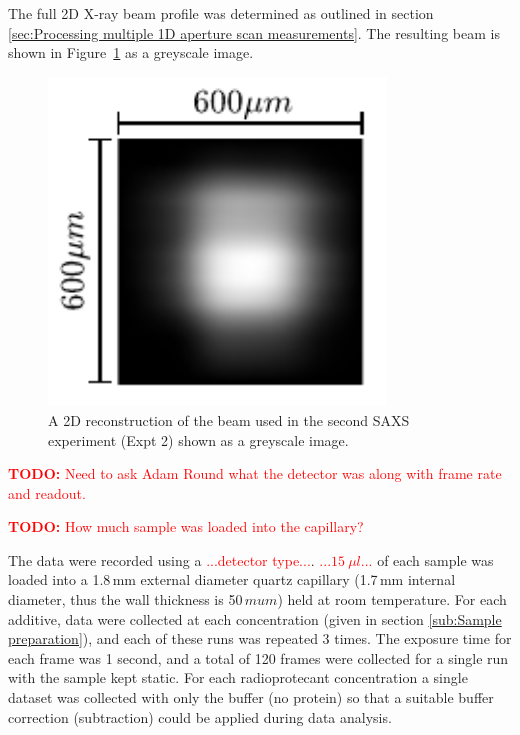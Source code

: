 The full 2D X-ray beam profile was determined as outlined in section \ref{sec:Processing multiple 1D aperture scan measurements}. The resulting beam is shown in Figure~\ref{fig:SAXS beam profile} as a greyscale image.
\begin{figure}
    \centering
    \includegraphics[width=0.8\textwidth]{figures/saxs/SAXS_beam.pdf}
    \caption[A 2D reconstruction of the beam used in the second SAXS experiment]{A 2D reconstruction of the beam used in the second SAXS experiment (Expt 2) shown as a greyscale image.}
    \label{fig:SAXS beam profile}
\end{figure}

\textcolor{red}{
    \begin{myenumerate}
        \item \hypertarget{todo:Detector type}{\textbf{TODO:} Need to ask Adam Round what the detector was along with frame rate and readout.}
        \item \hypertarget{todo:Detector type}{\textbf{TODO:} How much sample was loaded into the capillary?}
    \end{myenumerate}
}
The data were recorded using a \textcolor{red}{...detector type...}.
\textcolor{red}{...$15\ \mu l$...} of each sample was loaded into a 1.8$\,$mm external diameter quartz capillary (1.7\,mm internal diameter, thus the wall thickness is 50$\,mu m$) held at room temperature.
For each additive, data were collected at each concentration (given in section \ref{sub:Sample preparation}), and each of these runs was repeated 3 times.
The exposure time for each frame was 1 second, and a total of 120 frames were collected for a single run with the sample kept static.
For each radioprotecant concentration a single dataset was collected with only the buffer (no protein) so that a suitable buffer correction (subtraction) could be applied during data analysis.

